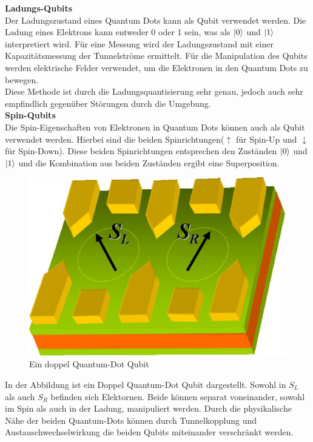 \textbf{Ladungs-Qubits}\\
Der Ladungszustand eines Quantum Dots kann als Qubit verwendet werden. Die Ladung eines Elektrons kann entweder 0 oder 1 sein, was als $\ket{0}$ und $\ket{1}$ interpretiert wird.
Für eine Messung wird der Ladungszustand mit einer Kapazitätsmessung der Tunnelströme ermittelt.
Für die Manipulation des Qubits werden elektrische Felder verwendet, um die Elektronen in den Quantum Dots zu bewegen.\\

Diese Methode ist durch die Ladungsquantisierung sehr genau, jedoch auch sehr empfindlich gegenüber Störungen durch die Umgebung.\\

\textbf{Spin-Qubits}\\
Die Spin-Eigenschaften von Elektronen in Quantum Dots können auch als Qubit verwendet werden. Hierbei sind die beiden Spinrichtungen($\uparrow$ für Spin-Up und $\downarrow$ für Spin-Down).
Diese beiden Spinrichtungen entsprechen den Zuständen $\ket{0}$ und $\ket{1}$ und die Kombination aus beiden Zuständen ergibt eine Superposition.\\

\begin{figure}[H]
    \centering
    \includegraphics[width=0.75\linewidth]{img/QD.png}
    \caption{Ein doppel Quantum-Dot Qubit \cite{Golovach_condensed_2006}}
    \label{fig:double-Quantum-Dot}
\end{figure}

In der Abbildung ist ein Doppel Quantum-Dot Qubit dargestellt. Sowohl in $S_L$ als auch $S_R$ befinden sich Elektornen. Beide können separat voneinander, sowohl im Spin als auch in der Ladung, manipuliert werden.
Durch die physikalische Nähe der beiden Quantum-Dots können durch Tunnelkopplung und Austauschwechselwirkung die beiden Qubits miteinander verschränkt werden.\\

